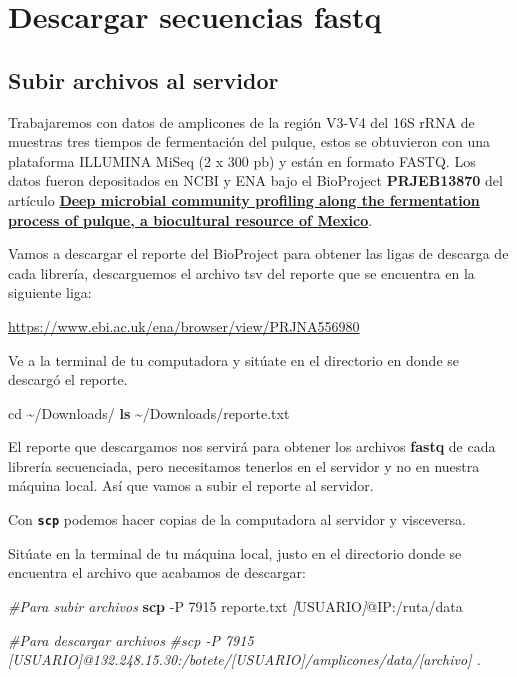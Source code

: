 \documentclass[
]{book}
\newenvironment{Shaded}{\begin{snugshade}}{\end{snugshade}}
\newcommand{\AttributeTok}[1]{\textcolor[rgb]{0.13,0.29,0.53}{#1}}
\newcommand{\BuiltInTok}[1]{#1}
\newcommand{\CommentTok}[1]{\textcolor[rgb]{0.56,0.35,0.01}{\textit{#1}}}
\newcommand{\FunctionTok}[1]{\textcolor[rgb]{0.13,0.29,0.53}{\textbf{#1}}}
\newcommand{\NormalTok}[1]{#1}
\newcommand{\PreprocessorTok}[1]{\textcolor[rgb]{0.56,0.35,0.01}{\textit{#1}}}
\newcommand{\SpecialStringTok}[1]{\textcolor[rgb]{0.31,0.60,0.02}{#1}}
\begin{document}
\section{Descargar secuencias fastq}\label{descargar-secuencias-fastq}

\subsection{Subir archivos al servidor}\label{subir-archivos-al-servidor}

Trabajaremos con datos de amplicones de la región V3-V4 del 16S rRNA de muestras tres tiempos de fermentación del pulque, estos se obtuvieron con una plataforma ILLUMINA MiSeq (2 x 300 pb) y están en formato FASTQ. Los datos fueron depositados en NCBI y ENA bajo el BioProject \textbf{PRJEB13870} del artículo \textbf{\href{https://www.sciencedirect.com/science/article/pii/S0944501320304614\#sec0010}{Deep microbial community profiling along the fermentation process of pulque, a biocultural resource of Mexico}}.

Vamos a descargar el reporte del BioProject para obtener las ligas de descarga de cada librería, descarguemos el archivo tsv del reporte que se encuentra en la siguiente liga:

\url{https://www.ebi.ac.uk/ena/browser/view/PRJNA556980}

Ve a la terminal de tu computadora y sitúate en el directorio en donde se descargó el reporte.

\begin{Shaded}
\begin{Highlighting}[]
\BuiltInTok{cd}\NormalTok{ \textasciitilde{}/Downloads/}
\FunctionTok{ls}\NormalTok{ \textasciitilde{}/Downloads/reporte.txt}
\end{Highlighting}
\end{Shaded}

El reporte que descargamos nos servirá para obtener los archivos \textbf{fastq} de cada librería secuenciada, pero necesitamos tenerlos en el servidor y no en nuestra máquina local. Así que vamos a subir el reporte al servidor.

Con \textbf{\texttt{scp}} podemos hacer copias de la computadora al servidor y visceversa.

Sitúate en la terminal de tu máquina local, justo en el directorio donde se encuentra el archivo que acabamos de descargar:

\begin{Shaded}
\begin{Highlighting}[]
\CommentTok{\#Para subir archivos}
\FunctionTok{scp} \AttributeTok{{-}P}\NormalTok{ 7915 reporte.txt }\PreprocessorTok{[}\SpecialStringTok{USUARIO}\PreprocessorTok{]}\NormalTok{@IP:/ruta/data}

\CommentTok{\#Para descargar archivos}
\CommentTok{\#scp {-}P 7915 [USUARIO]@132.248.15.30:/botete/[USUARIO]/amplicones/data/[archivo] .}
\end{Highlighting}
\end{Shaded}
\end{document}
